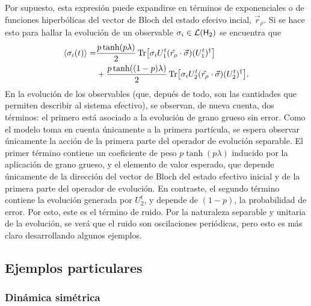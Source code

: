 Por supuesto, esta expresión puede expandirse en términos de exponenciales o de funciones hiperbólicas del vector de Bloch del estado efecivo incial, $\vec{r}_{\rho}$. Si se hace esto para hallar la evolución de un observable $\sigma_{i}\in\mathcal{L}({\sf H}_{2})$ se encuentra que
\begin{align}\label{eq:SeparableEvolutionExpVal}
    \begin{split}
        \expval{\sigma_{i}(t)}=&\frac{p\tanh(p\lambda)}{2}\Tr[\sigma_{i}U_{1}^{t}(\hat{r_{\rho}}\cdot\vec{\sigma})(U_{1}^{t})^{\dag}]\\
    &+\frac{p\tanh((1-p)\lambda)}{2}\Tr[\sigma_{i}U_{2}^{t}(\hat{r_{\rho}}\cdot\vec{\sigma})(U_{2}^{t})^{\dag}].
    \end{split}
  \end{align}
En la evolución de los observables (que, depués de todo, son las cantidades que permiten describir al sistema efectivo), se observan, de nueva cuenta, dos términos: el primero está asociado a la evolución de grano grueso sin error. Como el modelo toma en cuenta únicamente a la primera partícula, se espera observar únicamente la acción de la primera parte del operador de evolución separable. El primer término contiene un coeficiente de peso $p\tanh(p\lambda)$ inducido por la aplicación de grano grueso, y el elemento de valor esperado, que depende únicamente de la dirección del vector de Bloch del estado efectivo inicial y de la primera parte del operador de evolución. En contraste, el segundo término contiene la evolución generada por $U_{2}^{t}$, y depende de $(1-p)$, la probabilidad de error. Por esto, este es el término de ruido. Por la naturaleza separable y unitaria de la evolución, se verá que el ruido son oscilaciones periódicas, pero esto es más claro desarrollando algunos ejemplos.

\subsection{Ejemplos particulares}

\subsubsection{Dinámica simétrica}

